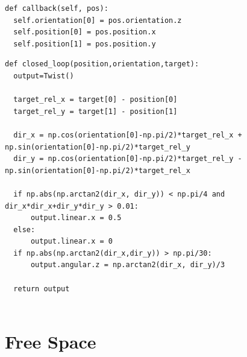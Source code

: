 \documentclass[12pt, a4paper]{report}
\begin{document}
\begin{lstlisting}
def callback(self, pos):
  self.orientation[0] = pos.orientation.z
  self.position[0] = pos.position.x
  self.position[1] = pos.position.y
\end{lstlisting}

\begin{lstlisting}
def closed_loop(position,orientation,target):
  output=Twist()

  target_rel_x = target[0] - position[0]
  target_rel_y = target[1] - position[1]

  dir_x = np.cos(orientation[0]-np.pi/2)*target_rel_x + np.sin(orientation[0]-np.pi/2)*target_rel_y
  dir_y = np.cos(orientation[0]-np.pi/2)*target_rel_y - np.sin(orientation[0]-np.pi/2)*target_rel_x

  if np.abs(np.arctan2(dir_x, dir_y)) < np.pi/4 and dir_x*dir_x+dir_y*dir_y > 0.01:
      output.linear.x = 0.5
  else:
      output.linear.x = 0
  if np.abs(np.arctan2(dir_x,dir_y)) > np.pi/30:
      output.angular.z = np.arctan2(dir_x, dir_y)/3

  return output
  
\end{lstlisting}

\section{Free Space}
\end{document}
